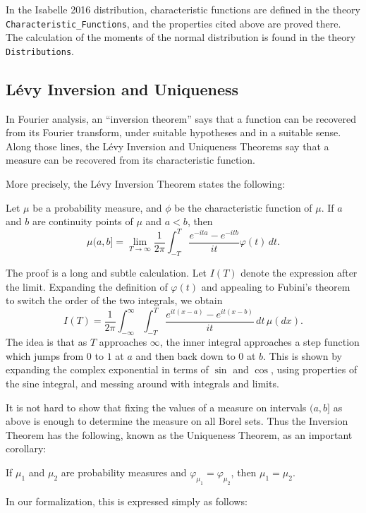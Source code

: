 \documentclass{svjour3}
\newcommand{\ph}{\varphi}
\newcommand{\todo}[1]{\fxnote{#1}}
\begin{document}
In the Isabelle 2016 distribution, characteristic functions are defined in the theory \verb=Characteristic_Functions=, and the properties cited above are proved there. The calculation of the moments of the normal distribution is found in the theory \verb=Distributions=.

\subsection{L\'evy Inversion and Uniqueness}

In Fourier analysis, an ``inversion theorem'' says that a function can be recovered from its Fourier transform, under suitable hypotheses and in a suitable sense. Along those lines, the L\'evy Inversion and Uniqueness Theorems say that a measure can be recovered from its characteristic function. 

More precisely, the L\'evy Inversion Theorem states the following:
\begin{theorem}
Let $\mu$ be a probability measure, and $\phi$ be the characteristic function of $\mu$. If $a$ and $b$ are continuity points of $\mu$ and $a < b$, then
\[ 
\mu (a,b] = \lim_{T \rightarrow \infty} \frac{1}{2\pi} \int_{-T}^T \frac{e^{-ita} - e^{-itb}}{it} \ph(t) \, dt. 
\]
\end{theorem}

The proof is a long and subtle calculation. Let $I(T)$ denote the expression after the limit. Expanding the definition of $\ph(t)$ and appealing to Fubini's theorem to switch the order of the two integrals, we obtain
\[
I(T) = \frac{1}{2\pi} \int_{-\infty}^\infty \int_{-T}^T \frac{e^{it(x-a)} - e^{it(x-b)}}{it} \, dt \, \mu(dx). 
\]
The idea is that as $T$ approaches $\infty$, the inner integral approaches a step function which jumps from $0$ to $1$ at $a$ and then back down to $0$ at $b$. This is shown by expanding the complex exponential in terms of $\sin$ and $\cos$, using properties of the sine integral, and messing around with integrals and limits.

It is not hard to show that fixing the values of a measure on intervals $(a, b]$ as above is enough to determine the measure on all Borel sets. Thus the Inversion Theorem has the following, known as the Uniqueness Theorem, as an important corollary:
\begin{theorem}
If $\mu_1$ and $\mu_2$ are probability measures and $\ph_{\mu_1} = \ph_{\mu_2}$, then $\mu_1 = \mu_2$. 
\end{theorem}
In our formalization, this is expressed simply as follows:
\begin{quote}
 \todo{Insert Levy uniqueness}
\end{quote}
\end{document}
